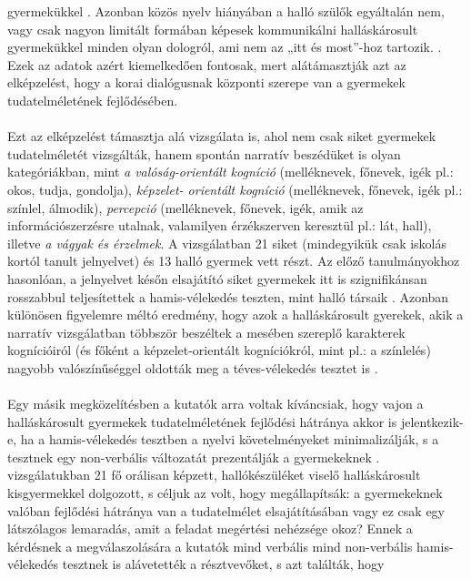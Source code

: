gyermekükkel \autocite{peterson_siegal_1999}. Azonban közös nyelv hiányában a halló szülők egyáltalán nem, vagy
csak nagyon limitált formában képesek kommunikálni halláskárosult gyermekükkel minden
olyan dologról, ami nem az „itt és most”-hoz tartozik. \autocite{peterson_siegal_1999}. Ezek az adatok azért
kiemelkedően fontosak, mert alátámasztják azt az elképzelést, hogy a korai dialógusnak
központi szerepe van a gyermekek tudatelméletének fejlődésében. \\
\\
Ezt az elképzelést támasztja alá \textcite{peterson_slaughter_2006} vizsgálata is, ahol nem csak siket gyermekek
tudatelméletét vizsgálták, hanem spontán narratív beszédüket is olyan kategóriákban, mint \textit{a
	valóság-orientált kogníció} (melléknevek, főnevek, igék pl.: okos, tudja, gondolja), \textit{képzelet-
	orientált kogníció } (melléknevek, főnevek, igék pl.: színlel, álmodik), \textit{percepció} (melléknevek,
főnevek, igék, amik az információszerzésre utalnak, valamilyen érzékszerven keresztül pl.:
lát, hall), illetve \textit{a vágyak és érzelmek}. A vizsgálatban 21 siket (mindegyikük csak iskolás kortól
tanult jelnyelvet) és 13 halló gyermek vett részt. Az előző tanulmányokhoz hasonlóan, a
jelnyelvet későn elsajátító siket gyermekek itt is szignifikánsan rosszabbul teljesítettek a
hamis-vélekedés teszten, mint halló társaik \autocite{peterson_slaughter_2006}. Azonban különösen figyelemre méltó
eredmény, hogy azok a halláskárosult gyerekek, akik a narratív vizsgálatban többször
beszéltek a mesében szereplő karakterek kognícióiról (és főként a képzelet-orientált
kogní\-ciókról, mint pl.: a színlelés) nagyobb valószínűséggel oldották meg a téves-vélekedés
tesztet is \autocite{peterson_slaughter_2006}.\\
\\
Egy másik megközelítésben a kutatók arra voltak kíváncsiak, hogy vajon a halláskárosult
gyermekek tudatelméletének fejlődési hátránya akkor is jelentkezik-e, ha a hamis-vélekedés
tesztben a nyelvi követelményeket minimalizálják, s a tesztnek egy non-verbális válto\-zatát
prezentálják a gyermekeknek \autocite{figueras-costa_harris_2001}. \textcite{figueras-costa_harris_2001}
vizsgálatukban 21 fő orálisan képzett, hallókészüléket viselő halláskárosult kisgyermekkel
dolgozott, s céljuk az volt, hogy megállapítsák: a gyermekeknek valóban fejlődési hátránya
van a tudatelmélet elsajátításában vagy ez csak egy látszólagos lemaradás, amit a feladat
megértési nehézsége okoz? Ennek a kérdésnek a megválaszolására a kutatók mind verbális
mind non-verbális hamis-vélekedés tesztnek is alávetették a résztvevőket, s azt találták, hogy
